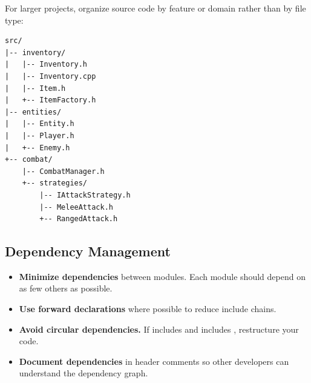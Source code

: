For larger projects, organize source code by feature or domain rather than by file type:

\begin{lstlisting}[style=tree]
src/
|-- inventory/
|   |-- Inventory.h
|   |-- Inventory.cpp
|   |-- Item.h
|   +-- ItemFactory.h
|-- entities/
|   |-- Entity.h
|   |-- Player.h
|   +-- Enemy.h
+-- combat/
    |-- CombatManager.h
    +-- strategies/
        |-- IAttackStrategy.h
        |-- MeleeAttack.h
        +-- RangedAttack.h
\end{lstlisting}

\subsection{Dependency Management}

\begin{itemize}
  \item \textbf{Minimize dependencies} between modules. Each module should depend on as few others as possible.
  \item \textbf{Use forward declarations} where possible to reduce include chains.
  \item \textbf{Avoid circular dependencies.} If  includes  and  includes , restructure your code.
  \item \textbf{Document dependencies} in header comments so other developers can understand the dependency graph.
\end{itemize}
